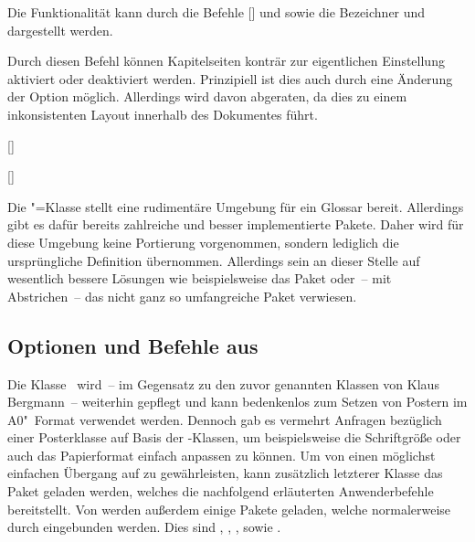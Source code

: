 \begin{DeclareEntity}{}
\begin{Declaration}
Die Funktionalität kann durch die Befehle [] 
und  sowie die Bezeichner  und 
 dargestellt werden.
\end{Declaration}

\begin{Declaration}
  {}
\printdeclarationlist

Durch diesen Befehl können Kapitelseiten konträr zur eigentlichen Einstellung 
aktiviert oder deaktiviert werden. Prinzipiell ist dies auch durch eine 
Änderung der Option  möglich. Allerdings wird davon 
abgeraten, da dies zu einem inkonsistenten Layout innerhalb des Dokumentes 
führt.
\end{Declaration}

\begin{Declaration}
  {[]}
\begin{Declaration}
  {[]}
\printdeclarationlist

Die "=Klasse stellt eine rudimentäre Umgebung für ein Glossar 
bereit. Allerdings gibt es dafür bereits zahlreiche und besser implementierte 
Pakete. Daher wird für diese Umgebung keine Portierung vorgenommen, sondern 
lediglich die ursprüngliche Definition übernommen. Allerdings sein an dieser 
Stelle auf wesentlich bessere Lösungen wie beispielsweise das Paket 
 oder~-- mit Abstrichen~-- das nicht ganz so umfangreiche 
Paket  verwiesen.
\end{Declaration}
\end{Declaration}
%



\subsection{%
  Optionen und Befehle aus %
}

%
Die Klasse~ wird~-- im Gegensatz zu den zuvor genannten 
Klassen von Klaus Bergmann~-- weiterhin gepflegt und kann bedenkenlos zum 
Setzen von Postern im A0"~Format verwendet werden. Dennoch gab es vermehrt 
Anfragen bezüglich einer Posterklasse auf Basis der \TUDScript-Klassen, um 
beispielsweise die Schriftgröße oder auch das Papierformat einfach anpassen zu 
können. Um von  einen möglichst einfachen Übergang auf 
 zu gewährleisten, kann zusätzlich letzterer Klasse das 
Paket  geladen werden, welches die nachfolgend erläuterten 
Anwenderbefehle bereitstellt. Von  werden außerdem einige 
Pakete geladen, welche normalerweise durch  eingebunden 
werden. Dies sind , , , 
 sowie .


\end{DeclareEntity}

